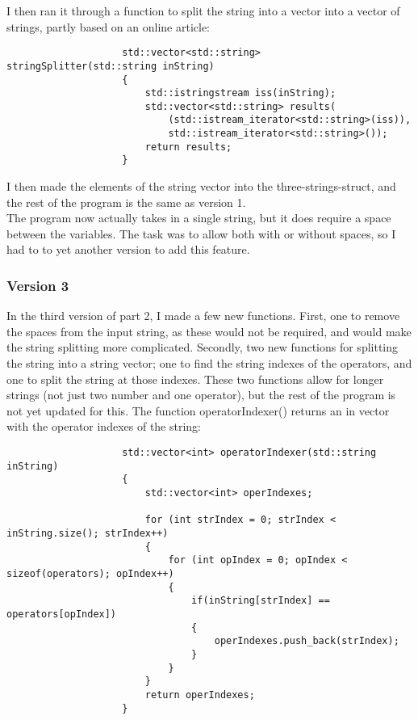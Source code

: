 \documentclass{article}
\begin{document}
				I then ran it through a function to split the string into a vector into a vector of strings, partly based on an online article: \cite{cppSplitStr}
				\begin{lstlisting}
					std::vector<std::string> stringSplitter(std::string inString)
					{
						std::istringstream iss(inString);
						std::vector<std::string> results(
							(std::istream_iterator<std::string>(iss)),
							std::istream_iterator<std::string>());
						return results;
					}
				\end{lstlisting}
				
				I then made the elements of the string vector into the three-strings-struct, and the rest of the program is the same as version 1. \\
				The program now actually takes in a single string, but it does require a space between the variables. The task was to allow both with or without spaces, so I had to to yet another version to add this feature.
			
			
			\subsubsection{Version 3}
				In the third version of part 2, I made a few new functions. First, one to remove the spaces from the input string, as these would not be required, and would make the string splitting more complicated. Secondly, two new functions for splitting the string into a string vector; one to find the string indexes of the operators, and one to split the string at those indexes. These two functions allow for longer strings (not just two number and one operator), but the rest of the program is not yet updated for this.
				The function operatorIndexer() returns an in vector with the operator indexes of the string:
				\begin{lstlisting}
					std::vector<int> operatorIndexer(std::string inString)
					{
						std::vector<int> operIndexes;
						
						for (int strIndex = 0; strIndex < inString.size(); strIndex++)
						{
							for (int opIndex = 0; opIndex < sizeof(operators); opIndex++)
							{
								if(inString[strIndex] == operators[opIndex])
								{
									operIndexes.push_back(strIndex);
								}
							}
						}
						return operIndexes;
					}
				\end{lstlisting}
				
\end{document}
